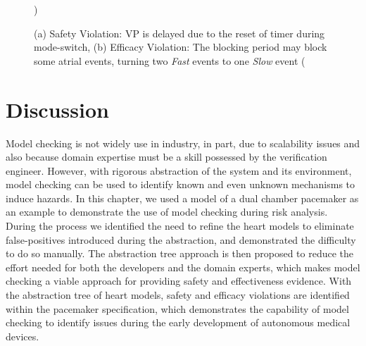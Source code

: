 \begin{figure}
\centering
	\caption{(a) Safety Violation: VP is delayed due to the reset of timer during mode-switch, (b) Efficacy Violation: The blocking period may block some atrial events, turning two \emph{Fast} events to one \emph{Slow} event (\cite{TACAS12}})
\end{figure} 

\section{Discussion}
Model checking is not widely use in industry, in part, due to scalability issues and also because domain expertise must be a skill possessed by the verification engineer. 
However, with rigorous abstraction of the system and its environment, model checking can be used to identify 
known and even unknown mechanisms to induce hazards. 
In this chapter, we used a model of a dual chamber pacemaker as an example to demonstrate the use of model checking during risk analysis. 
During the process we identified the need to refine the heart models to eliminate false-positives introduced during the abstraction, and demonstrated the difficulty to do so manually. 
The abstraction tree approach is then proposed to reduce the effort needed for both the developers and the domain experts, which makes model checking a viable approach for providing safety and effectiveness evidence. 
With the abstraction tree of heart models, safety and efficacy violations are identified within the pacemaker specification, which demonstrates the capability of model checking to identify issues during the early development of autonomous medical devices.
